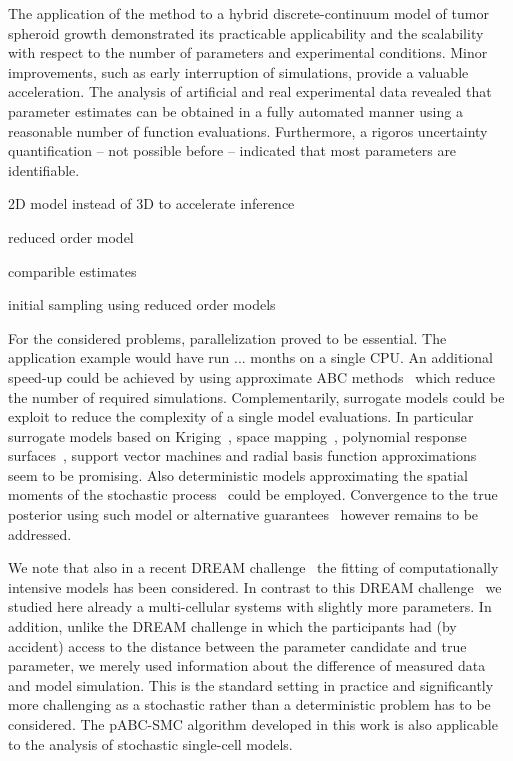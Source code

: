 \documentclass[10pt,letterpaper]{article}
\newcommand{\jh}[1]{{\color{red}#1}}
\begin{document}
The application of the method to a hybrid discrete-continuum model of tumor spheroid growth demonstrated its practicable applicability and the scalability with respect to the number of parameters and experimental conditions. Minor improvements, such as early interruption of simulations, provide a valuable acceleration. The analysis of artificial and real experimental data revealed that parameter estimates can be obtained in a fully automated manner using a reasonable number of function evaluations. Furthermore, a rigoros uncertainty quantification -- not possible before -- indicated that most parameters are identifiable.

\jh{
2D model instead of 3D to accelerate inference

reduced order model

comparible estimates

initial sampling using reduced order models
}

For the considered problems, parallelization proved to be essential. The application example would have run \jh{... months} on a single CPU. An additional speed-up could be achieved by using approximate ABC methods~\cite{BuzbasRos2013} which reduce the number of required simulations. Complementarily, surrogate models could be exploit to reduce the complexity of a single model evaluations. In particular surrogate models based on Kriging~\cite{Wilkinson2011}, space mapping~\cite{BandlerDak2004}, polynomial response surfaces~\cite{BoxDra2007}, support vector machines and radial basis function approximations~\cite{RegisShoe2007} seem to be promising. Also deterministic models approximating the spatial moments of the stochastic process~\cite{BolkerPac1997,MiddletonFle2014} could be employed. Convergence to the true posterior using such model or alternative guarantees~\cite{HasenauerLoh2012} however remains to be addressed.

We note that also in a recent DREAM challenge~\cite{KarrWil2015} the fitting of computationally intensive models has been considered. In contrast to this DREAM challenge~\cite{KarrWil2015} we studied here already a multi-cellular systems with slightly more parameters. In addition, unlike the DREAM challenge in which the participants had (by accident) access to the distance between the parameter candidate and true parameter, we merely used information about the difference of measured data and model simulation. This is the standard setting in practice and significantly more challenging as a stochastic rather than a deterministic problem has to be considered. The pABC-SMC algorithm developed in this work is also applicable to the analysis of stochastic single-cell models.
\end{document}
